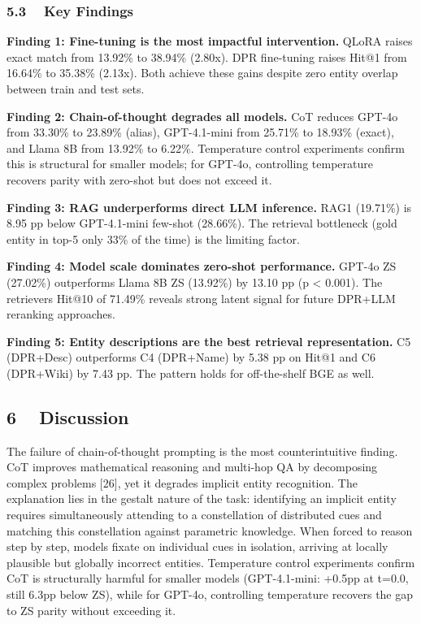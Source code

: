 \documentclass[
]{article}
\begin{document}
\subsubsection{5.3 ~ Key Findings}\label{key-findings}

\textbf{Finding 1: Fine-tuning is the most impactful intervention.}
QLoRA raises exact match from 13.92\% to 38.94\% (2.80x). DPR
fine-tuning raises Hit@1 from 16.64\% to 35.38\% (2.13x). Both achieve
these gains despite zero entity overlap between train and test sets.

\textbf{Finding 2: Chain-of-thought degrades all models.} CoT reduces
GPT-4o from 33.30\% to 23.89\% (alias), GPT-4.1-mini from 25.71\% to
18.93\% (exact), and Llama 8B from 13.92\% to 6.22\%. Temperature
control experiments confirm this is structural for smaller models; for
GPT-4o, controlling temperature recovers parity with zero-shot but does
not exceed it.

\textbf{Finding 3: RAG underperforms direct LLM inference.} RAG1
(19.71\%) is 8.95 pp below GPT-4.1-mini few-shot (28.66\%). The
retrieval bottleneck (gold entity in top-5 only 33\% of the time) is the
limiting factor.

\textbf{Finding 4: Model scale dominates zero-shot performance.} GPT-4o
ZS (27.02\%) outperforms Llama 8B ZS (13.92\%) by 13.10 pp (p
\textless{} 0.001). The retriever\textquotesingle s Hit@10 of 71.49\%
reveals strong latent signal for future DPR+LLM reranking approaches.

\textbf{Finding 5: Entity descriptions are the best retrieval
representation.} C5 (DPR+Desc) outperforms C4 (DPR+Name) by 5.38 pp on
Hit@1 and C6 (DPR+Wiki) by 7.43 pp. The pattern holds for off-the-shelf
BGE as well.

\subsection{6 ~ Discussion}\label{discussion}

The failure of chain-of-thought prompting is the most counterintuitive
finding. CoT improves mathematical reasoning and multi-hop QA by
decomposing complex problems {[}26{]}, yet it degrades implicit entity
recognition. The explanation lies in the gestalt nature of the task:
identifying an implicit entity requires simultaneously attending to a
constellation of distributed cues and matching this constellation
against parametric knowledge. When forced to reason step by step, models
fixate on individual cues in isolation, arriving at locally plausible
but globally incorrect entities. Temperature control experiments confirm
CoT is structurally harmful for smaller models (GPT-4.1-mini: +0.5pp at
t=0.0, still 6.3pp below ZS), while for GPT-4o, controlling temperature
recovers the gap to ZS parity without exceeding it.
\end{document}
